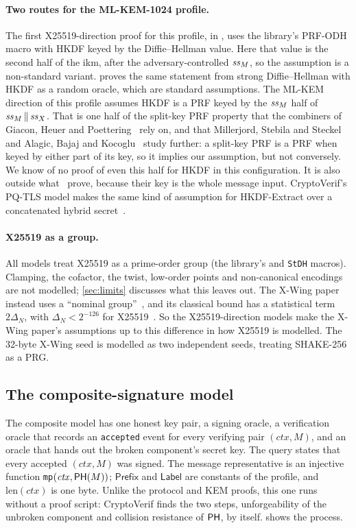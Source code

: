 \paragraph{Two routes for the ML-KEM-1024 profile.} The first X25519-direction
proof for this profile, in , uses the library's
PRF-ODH macro with HKDF keyed by the Diffie--Hellman value. Here that value
is the second half of the ikm, after the adversary-controlled $\mathit{ss}_M$, so
the assumption is a non-standard variant. 
proves the same statement from strong Diffie--Hellman with HKDF as a random
oracle, which are standard assumptions. The ML-KEM direction of this profile
assumes HKDF is a PRF keyed by the $\mathit{ss}_M$ half of $\mathit{ss}_M \,\|\, \mathit{ss}_X$.
That is one half of the split-key PRF property that the combiners of
Giacon, Heuer and Poettering~\cite{GHP18} rely on, and that Millerjord,
Stebila and Steckel~\cite{MSS26} and Alagic, Bajaj and Kocoglu~\cite{ABK25}
study further: a split-key PRF is a PRF when keyed by either part of its
key, so it implies our assumption, but not conversely. We know of no proof
of even this half for HKDF in this configuration. It is also outside
what~\cite{BBGS23} prove, because their key is the whole message input. CryptoVerif's PQ-TLS model
makes the same kind of assumption for HKDF-Extract over a concatenated hybrid
secret~\cite{BJ24}.

\paragraph{X25519 as a group.} All models treat X25519 as a prime-order group
(the library's  and \texttt{StDH} macros). Clamping, the
cofactor, the twist, low-order points and non-canonical encodings are not
modelled; \cref{sec:limits} discusses what this leaves out. The X-Wing
paper instead uses a ``nominal group''~\cite{ABHKLR21,XWing}, and its
classical bound has a statistical term $2\Delta_N$, with
$\Delta_N < 2^{-126}$ for X25519~\cite{XWing}. So the X25519-direction models make the X-Wing
paper's assumptions up to this difference in how X25519 is modelled. The
32-byte X-Wing seed is modelled as two independent seeds, treating SHAKE-256
as a PRG.

\subsection{The composite-signature model}\label{sec:mech:sig}

The composite model has one honest key pair, a signing oracle, a
verification oracle that records an \texttt{accepted} event for every
verifying pair $(\mathit{ctx}, M)$, and an oracle that hands out the broken
component's secret key. The query states that every accepted
$(\mathit{ctx}, M)$ was signed. The message representative is an injective
function \texttt{mp}$(\mathit{ctx}, \mathsf{PH}(M))$; $\mathsf{Prefix}$ and
$\mathsf{Label}$ are constants of the profile, and $\mathrm{len}(\mathit{ctx})$
is one byte. Unlike the protocol and KEM proofs, this one runs without a
proof script: CryptoVerif finds the two steps, unforgeability of the
unbroken component and collision resistance of $\mathsf{PH}$, by itself.
 shows the process.
